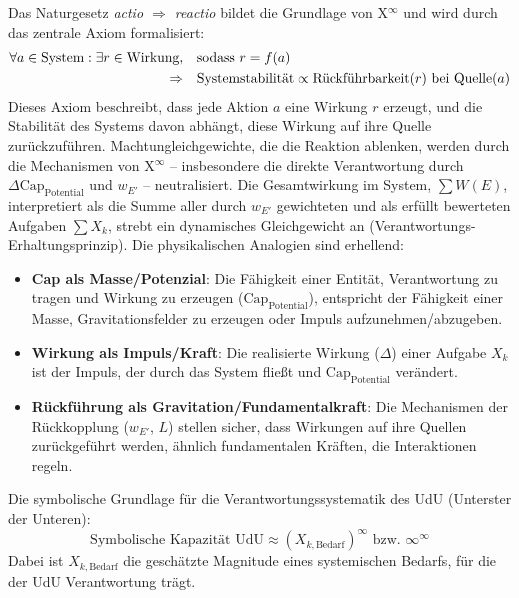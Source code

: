 \documentclass[12pt]{scrartcl}
\begin{document}
Das Naturgesetz \emph{actio $\Rightarrow$ reactio} bildet die Grundlage von X$^\infty$ und wird durch das zentrale Axiom formalisiert:
\begin{align}
\forall a \in \text{System}: \exists r \in \text{Wirkung}, \quad &\text{sodass } r = f(a) \notag \\
\Rightarrow \quad &\text{Systemstabilität} \propto \text{Rückführbarkeit}(r) \text{ bei Quelle}(a)
\end{align}
Dieses Axiom beschreibt, dass jede Aktion $a$ eine Wirkung $r$ erzeugt, und die Stabilität des Systems davon abhängt, diese Wirkung auf ihre Quelle zurückzuführen. Machtungleichgewichte, die die Reaktion ablenken, werden durch die Mechanismen von X$^\infty$ – insbesondere die direkte Verantwortung durch $\Delta\text{Cap}_{\text{Potential}}$ und $w_{E'}$ – neutralisiert. Die Gesamtwirkung im System, $\sum W(E)$, interpretiert als die Summe aller durch $w_{E'}$ gewichteten und als erfüllt bewerteten Aufgaben $\sum X_k$, strebt ein dynamisches Gleichgewicht an (Verantwortungs-Erhaltungsprinzip). Die physikalischen Analogien sind erhellend:
\begin{itemize}
    \item \textbf{Cap als Masse/Potenzial}: Die Fähigkeit einer Entität, Verantwortung zu tragen und Wirkung zu erzeugen ($\text{Cap}_{\text{Potential}}$), entspricht der Fähigkeit einer Masse, Gravitationsfelder zu erzeugen oder Impuls aufzunehmen/abzugeben.
    \item \textbf{Wirkung als Impuls/Kraft}: Die realisierte Wirkung ($\Delta$) einer Aufgabe $X_k$ ist der Impuls, der durch das System fließt und $\text{Cap}_{\text{Potential}}$ verändert.
    \item \textbf{Rückführung als Gravitation/Fundamentalkraft}: Die Mechanismen der Rückkopplung ($w_{E'}$, $L$) stellen sicher, dass Wirkungen auf ihre Quellen zurückgeführt werden, ähnlich fundamentalen Kräften, die Interaktionen regeln.
\end{itemize}

Die symbolische Grundlage für die Verantwortungssystematik des UdU (Unterster der Unteren):
\begin{equation}
\text{Symbolische Kapazität UdU} \approx (X_{k, \text{Bedarf}})^\infty \text{ bzw. } \infty^\infty
\end{equation}
Dabei ist $X_{k,\text{Bedarf}}$ die geschätzte Magnitude eines systemischen Bedarfs, für die der UdU Verantwortung trägt.
\end{document}
